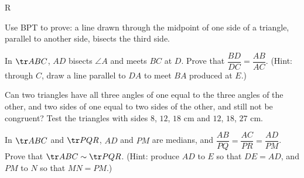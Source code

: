 \begin{exercise}{R}
  \item Use BPT to prove: a line drawn through the midpoint of one side of a triangle, parallel to another side, bisects the third side.
  \item In $\tr ABC$, $AD$ bisects $\angle A$ and meets $BC$ at $D$. Prove that $\dfrac{BD}{DC}=\dfrac{AB}{AC}$. (Hint: through $C$, draw a line parallel to $DA$ to meet $BA$ produced at $E$.)
  \begin{center}\end{center}
  \item Can two triangles have all three angles of one equal to the three angles of the other, and two sides of one equal to two sides of the other, and still not be congruent? Test the triangles with sides $8$, $12$, $18$ cm and $12$, $18$, $27$ cm.
  \item In $\tr ABC$ and $\tr PQR$, $AD$ and $PM$ are medians, and $\dfrac{AB}{PQ}=\dfrac{AC}{PR}=\dfrac{AD}{PM}$. Prove that $\tr ABC\sim\tr PQR$. (Hint: produce $AD$ to $E$ so that $DE=AD$, and $PM$ to $N$ so that $MN=PM$.)
\end{exercise}

